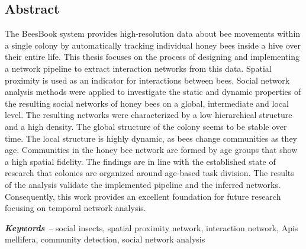 %
\pagestyle{empty}
\providecommand{\keywords}[1]{\textbf{\textit{Keywords --}} #1}

\subsection*{Abstract}
The BeesBook system provides high-resolution data about bee movements within a single colony by automatically tracking individual honey bees inside a hive over their entire life.
This thesis focuses on the process of designing and implementing a network pipeline to extract interaction networks from this data.
Spatial proximity is used as an indicator for interactions between bees.
Social network analysis methods were applied to investigate the static and dynamic properties of the resulting social networks of honey bees on a global, intermediate and local level.
The resulting networks were characterized by a low hierarchical structure and a high density.
The global structure of the colony seems to be stable over time.
The local structure is highly dynamic, as bees change communities as they age.
Communities in the honey bee network are formed by age groups that show a high spatial fidelity.
The findings are in line with the established state of research that colonies are organized around age-based task division.
The results of the analysis validate the implemented pipeline and the inferred networks.
Consequently, this work provides an excellent foundation for future research focusing on temporal network analysis.

\vspace{5mm}
\keywords{social insects, spatial proximity network, interaction network, Apis mellifera, community detection, social network analysis}

\cleardoublepage
